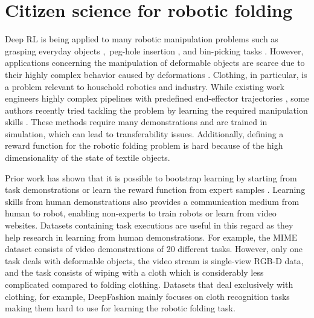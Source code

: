 \documentclass[\home/main.tex]{subfiles}
\begin{document}
\chapter{Citizen science for robotic folding}\label{ch:data_collection}

Deep \gls{RL} is being applied to many robotic manipulation problems such as grasping everyday objects \autocite{Levine2018},~peg-hole insertion \autocite{Finn2016}, and bin-picking tasks \autocite{Mahler2019}. However, applications concerning the manipulation of deformable objects are scarce due to their highly complex behavior caused by deformations \autocite{Foresti2004}. Clothing, in particular, is a problem relevant to household robotics and industry. While existing work engineers highly complex pipelines \autocite{Doumanoglou2016, Maitin2010} with predefined end-effector trajectories \autocite{Miller2012}, some authors recently tried tackling the problem by learning the required manipulation skills \autocite{Matas2018, Seita2018}. These methods require many demonstrations and are trained in simulation, which can lead to transferability issues. Additionally, defining a reward function for the robotic folding problem is hard because of the high dimensionality of the state of textile objects. \par 

Prior work has shown that it is possible to bootstrap learning by starting from task demonstrations \autocite{Vevcerik2017} or learn the reward function from expert samples \autocite{Abbeel2004}. Learning skills from human demonstrations also provides a communication medium from human to robot, enabling non-experts to train robots or learn from video websites. Datasets containing task executions are useful in this regard as they help research in learning from human demonstrations. For example, the MIME dataset \autocite{Sharma2018} consists of video demonstrations of 20 different tasks. However, only one task deals with deformable objects, the video stream is single-view RGB-D data, and the task consists of wiping with a cloth which is considerably less complicated compared to folding clothing. Datasets that deal exclusively with clothing, for example, DeepFashion \autocite{Liu2016} mainly focuses on cloth recognition tasks making them hard to use for learning the robotic folding task.
\end{document}
